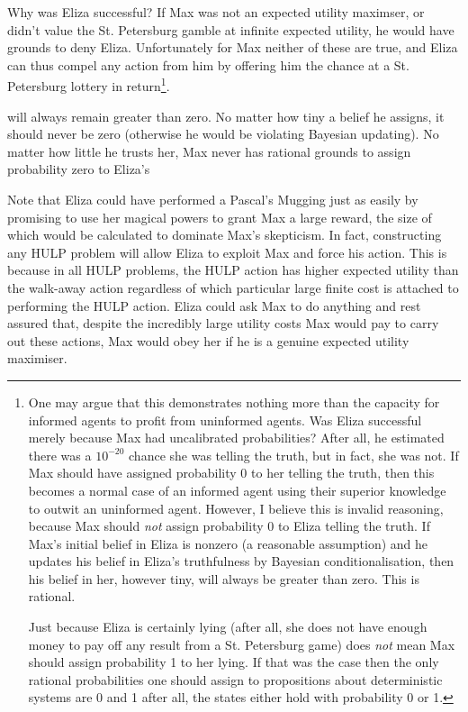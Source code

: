 \documentclass{article}
\begin{document}
Why was Eliza successful? If Max was not an expected utility maximser, or didn't value the St. Petersburg gamble at infinite expected utility, he would have grounds to deny Eliza. Unfortunately for Max neither of these are true, and Eliza can thus compel any action from him by offering him the chance at a St. Petersburg lottery in return\footnote{One may argue that this demonstrates nothing more than the capacity for informed agents to profit from uninformed agents. Was Eliza successful merely because Max had uncalibrated probabilities? After all, he estimated there was a \(10^{-20}\) chance she was telling the truth, but in fact, she was not. If Max should have assigned probability 0 to her telling the truth, then this becomes a normal case of an informed agent using their superior knowledge to outwit an uninformed agent. However, I believe this is invalid reasoning, because Max should \textit{not} assign probability 0 to Eliza telling the truth. If Max's initial belief in Eliza is nonzero (a reasonable assumption) and he updates his belief in Eliza's truthfulness by Bayesian conditionalisation, then his belief in her, however tiny, will always be greater than zero. This is rational. 

Just because Eliza is certainly lying (after all, she does not have enough money to pay off any result from a St. Petersburg game) does \textit{not} mean Max should assign probability 1 to her lying. If that was the case then the only rational probabilities one should assign to propositions about deterministic systems are 0 and 1 \textemdash{} after all, the states either hold with probability 0 or 1.}.

will always remain greater than zero. No matter how tiny a belief he assigns, it should never be zero (otherwise he would be violating Bayesian updating). No matter how little he trusts her, Max never has rational grounds to assign probability zero to Eliza's

Note that Eliza could have performed a Pascal's Mugging just as easily by promising to use her magical powers to grant Max a large reward, the size of which would be calculated to dominate Max's skepticism. In fact, constructing any HULP problem will allow Eliza to exploit Max and force his action. This is because in all HULP problems, the HULP action has higher expected utility than the walk-away action regardless of which particular large finite cost is attached to performing the HULP action. Eliza could ask Max to do anything and rest assured that, despite the incredibly large utility costs Max would pay to carry out these actions, Max would obey her if he is a genuine expected utility maximiser.
\end{document}
